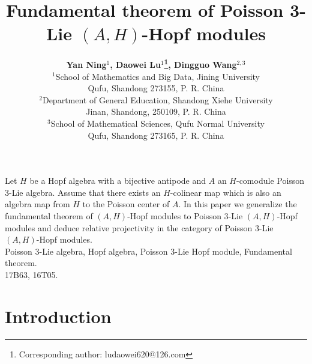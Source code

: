 \documentclass[11pt]{article}
\date{}
\begin{document}
\renewcommand{\baselinestretch}{1.2}
\renewcommand{\arraystretch}{1.0}
\title{\bf Fundamental theorem of Poisson 3-Lie $(A,H)$-Hopf modules}
 \date{}
\author {{\bf Yan Ning$^1$, Daowei Lu$^1$\footnote {Corresponding author:  ludaowei620@126.com}, Dingguo Wang$^{2,3}$}\\
{\small $^1$School of Mathematics and Big Data, Jining University}\\
{\small Qufu, Shandong 273155, P. R. China}\\
{\small $^2$Department of General Education, Shandong Xiehe University}\\
{\small Jinan, Shandong, 250109, P. R. China}\\
{\small $^3$School of Mathematical Sciences, Qufu Normal University}\\
{\small Qufu, Shandong 273165, P. R. China}
}
 \maketitle
\begin{center}
\begin{minipage}{12.cm}

 Let $H$ be a Hopf algebra with a bijective antipode and $A$ an $H$-comodule Poisson 3-Lie algebra. Assume that there exists an $H$-colinear map which is also an algebra map from $H$ to the Poisson center of $A$. In this paper we generalize the fundamental theorem of $(A, H)$-Hopf modules to Poisson 3-Lie $(A, H)$-Hopf modules and deduce relative projectivity in the category of Poisson 3-Lie $(A, H)$-Hopf modules.
\\

 Poisson 3-Lie algebra, Hopf algebra, Poisson 3-Lie Hopf module,  Fundamental theorem.
\\


  17B63, 16T05.
 \end{minipage}
 \end{center}
 \normalsize\vskip1cm

\section*{Introduction} 
\end{document}

